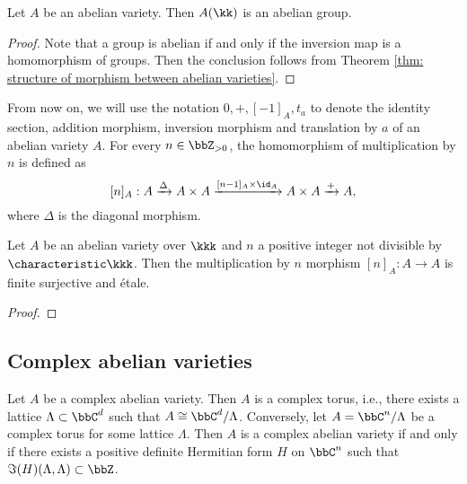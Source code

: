     \begin{proposition}\label{prop: abelian varieties are abelian groups}
        Let \( A \) be an abelian variety. 
        Then \( A(\kk) \) is an abelian group.
    \end{proposition}
    \begin{proof}
        Note that a group is abelian if and only if the inversion map is a homomorphism of groups.
        Then the conclusion follows from Theorem \ref{thm: structure of morphism between abelian varieties}.
    \end{proof}

    From now on, we will use the notation \(0, +, [-1]_A, t_a\) to denote the identity section, addition morphism, inversion morphism and translation by \(a\) of an abelian variety \(A\).
    For every \(n \in \bbZ_{>0}\), the homomorphism of multiplication by \(n\) is defined as 
    \[ [n]_A: A \xrightarrow{\Delta} A \times A \xrightarrow{[n-1]_A\times \id_A} A \times A \xrightarrow{+} A, \]
    where \(\Delta\) is the diagonal morphism.

    \begin{proposition}\label{prop:multiplication_by_n_is_etale_when_n_is_not_divisible_by_char}
        Let \(A\) be an abelian variety over \(\kkk\) and \(n\) a positive integer not divisible by \(\characteristic \kkk\).
        Then the multiplication by \(n\) morphism \([n]_A: A \to A\) is finite surjective and \'etale.
    \end{proposition}
    \begin{proof}
    \end{proof}

\subsection{Complex abelian varieties}

    \begin{theorem}\label{thm: complex abelian varieties are complex tori}
        Let \(A\) be a complex abelian variety.
        Then \(A\) is a complex torus, i.e., there exists a lattice \(\Lambda \subset \bbC^d\) such that \(A \cong \bbC^d / \Lambda\).
        Conversely, let \(A = \bbC^n/\Lambda\) be a complex torus for some lattice \(\Lambda\).
        Then \(A\) is a complex abelian variety if and only if there exists a positive definite Hermitian form \(H\) on \(\bbC^n\) such that \(\Im(H)(\Lambda, \Lambda) \subset \bbZ\).
    \end{theorem}


